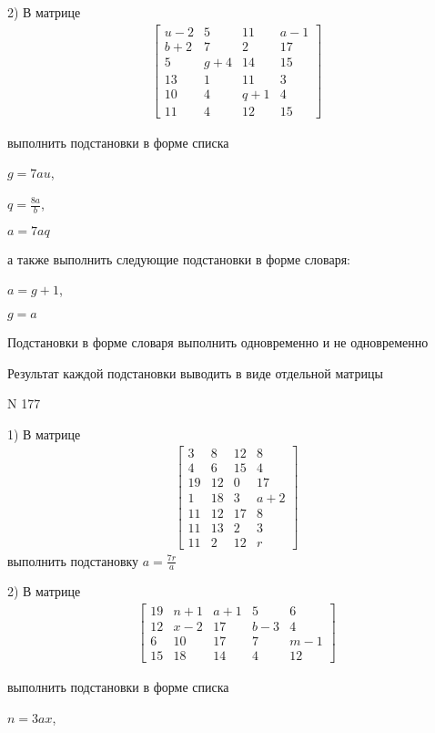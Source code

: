 \documentclass[11pt]{report}
\begin{document}
    2) В матрице
\begin{align*}
\left[\begin{matrix}u - 2 & 5 & 11 & a - 1\\b + 2 & 7 & 2 & 17\\5 & g + 4 & 14 & 15\\13 & 1 & 11 & 3\\10 & 4 & q + 1 & 4\\11 & 4 & 12 & 15\end{matrix}\right]
\end{align*}

выполнить подстановки в форме списка

$g=7 a u$,

$q=\frac{8 a}{b}$,

$a=7 a q$

а также выполнить следующие подстановки в форме словаря:

$a=g + 1$,

$g=a$


    Подстановки в форме словаря выполнить одновременно и не одновременно


    Результат каждой подстановки выводить в виде отдельной матрицы

\newpage
N 177


    1) В матрице
\begin{align*}
\left[\begin{matrix}3 & 8 & 12 & 8\\4 & 6 & 15 & 4\\19 & 12 & 0 & 17\\1 & 18 & 3 & a + 2\\11 & 12 & 17 & 8\\11 & 13 & 2 & 3\\11 & 2 & 12 & r\end{matrix}\right]
\end{align*}
выполнить подстановку $a=\frac{7 r}{a}$


    2) В матрице
\begin{align*}
\left[\begin{matrix}19 & n + 1 & a + 1 & 5 & 6\\12 & x - 2 & 17 & b - 3 & 4\\6 & 10 & 17 & 7 & m - 1\\15 & 18 & 14 & 4 & 12\end{matrix}\right]
\end{align*}

выполнить подстановки в форме списка

$n=3 a x$,
\end{document}
